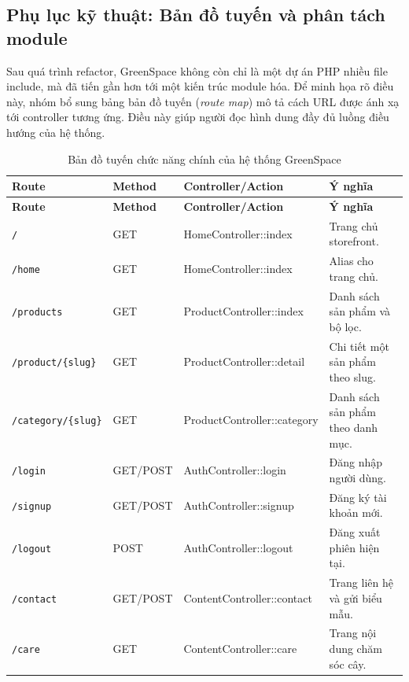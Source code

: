 \documentclass[11pt, a4paper]{article}
\begin{document}
\clearpage
\subsection{Phụ lục kỹ thuật: Bản đồ tuyến và phân tách module}

Sau quá trình refactor, GreenSpace không còn chỉ là một dự án PHP nhiều file include,
mà đã tiến gần hơn tới một kiến trúc module hóa. Để minh họa rõ điều này, nhóm bổ sung
bảng bản đồ tuyến (\textit{route map}) mô tả cách URL được ánh xạ tới controller tương ứng.
Điều này giúp người đọc hình dung đầy đủ luồng điều hướng của hệ thống.

\begingroup
\footnotesize
\setlength{\tabcolsep}{2pt}
\setlength{\LTpre}{0pt}
\setlength{\LTpost}{0pt}
\begin{longtable}{|p{3.0cm}|p{1.8cm}|p{4.0cm}|p{3.8cm}|}
    \caption{Bản đồ tuyến chức năng chính của hệ thống GreenSpace}
    \label{tab:route-map} \\
    \hline
    \textbf{Route} & \textbf{Method} & \textbf{Controller/Action} & \textbf{Ý nghĩa} \\ \hline
    \endfirsthead
    \hline
    \textbf{Route} & \textbf{Method} & \textbf{Controller/Action} & \textbf{Ý nghĩa} \\ \hline
    \endhead
    \texttt{/} & GET & HomeController::index & Trang chủ storefront. \\ \hline
    \texttt{/home} & GET & HomeController::index & Alias cho trang chủ. \\ \hline
    \texttt{/products} & GET & ProductController::index & Danh sách sản phẩm và bộ lọc. \\ \hline
    \texttt{/product/\{slug\}} & GET & ProductController::detail & Chi tiết một sản phẩm theo slug. \\ \hline
    \texttt{/category/\{slug\}} & GET & ProductController::category & Danh sách sản phẩm theo danh mục. \\ \hline
    \texttt{/login} & GET/POST & AuthController::login & Đăng nhập người dùng. \\ \hline
    \texttt{/signup} & GET/POST & AuthController::signup & Đăng ký tài khoản mới. \\ \hline
    \texttt{/logout} & POST & AuthController::logout & Đăng xuất phiên hiện tại. \\ \hline
    \texttt{/contact} & GET/POST & ContentController::contact & Trang liên hệ và gửi biểu mẫu. \\ \hline
    \texttt{/care} & GET & ContentController::care & Trang nội dung chăm sóc cây. \\ \hline

\end{longtable}
\end{document}
